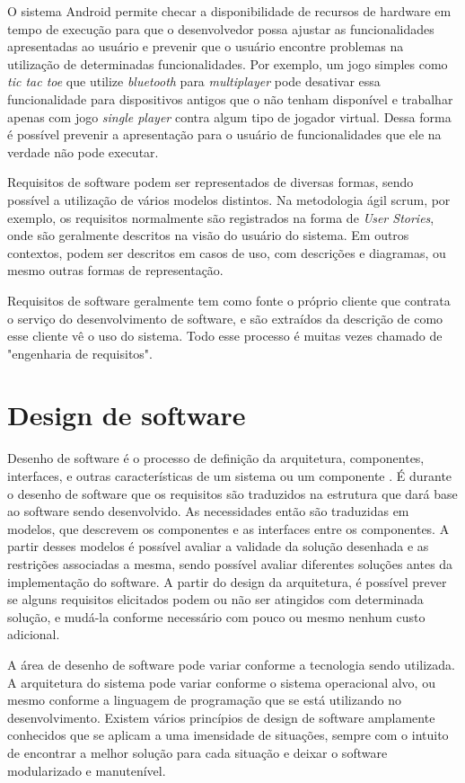 O sistema Android permite checar a disponibilidade de recursos de hardware em tempo de execução para que o desenvolvedor possa ajustar as funcionalidades apresentadas ao usuário e prevenir que o usuário encontre problemas na utilização de determinadas funcionalidades. Por exemplo, um jogo simples como \textit{tic tac toe} que utilize \textit{bluetooth} para \textit{multiplayer} pode desativar essa funcionalidade para dispositivos antigos que o não tenham disponível e trabalhar apenas com jogo \textit{single player} contra algum tipo de jogador virtual. Dessa forma é possível prevenir a apresentação para o usuário de funcionalidades que ele na verdade não pode executar.

Requisitos de software podem ser representados de diversas formas, sendo possível a utilização de vários modelos distintos. Na metodologia ágil scrum, por exemplo, os requisitos normalmente são registrados na forma de \textit{User Stories}, onde são geralmente descritos na visão do usuário do sistema. Em outros contextos, podem ser descritos em casos de uso, com descrições e diagramas, ou mesmo outras formas de representação.

Requisitos de software geralmente tem como fonte o próprio cliente que contrata o serviço do desenvolvimento de software, e são extraídos da descrição de como esse cliente vê o uso do sistema. Todo esse processo é muitas vezes chamado de "engenharia de requisitos".

\section{Design de software}

Desenho de software é o processo de definição da arquitetura, componentes, interfaces, e outras características de um sistema ou um componente \cite{swebok}. É durante o desenho de software que os requisitos são traduzidos na estrutura que dará base ao software sendo desenvolvido. As necessidades então são traduzidas em modelos, que descrevem os componentes e as interfaces entre os componentes. A partir desses modelos é possível avaliar a validade da solução desenhada e as restrições associadas a mesma, sendo possível avaliar diferentes soluções antes da implementação do software. A partir do design da arquitetura, é possível prever se alguns requisitos elicitados podem ou não ser atingidos com determinada solução, e mudá-la conforme necessário com pouco ou mesmo nenhum custo adicional.

A área de desenho de software pode variar conforme a tecnologia sendo utilizada. A arquitetura do sistema pode variar conforme o sistema operacional alvo, ou mesmo conforme a linguagem de programação que se está utilizando no desenvolvimento. Existem vários princípios de design de software amplamente conhecidos que se aplicam a uma imensidade de situações, sempre com o intuito de encontrar a melhor solução para cada situação e deixar o software modularizado e manutenível.

